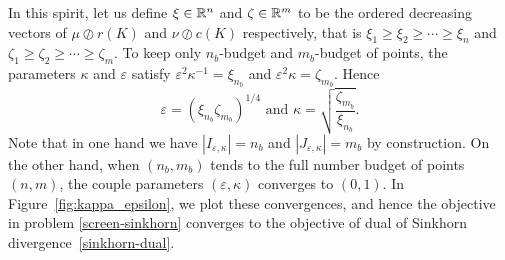 In this spirit, let us define $\xi \in {\mathbb{R}}^n$ and $\zeta \in {\mathbb{R}}^m$ to be the ordered decreasing vectors of $\mu \oslash r(K)$ and $\nu \oslash c(K)$ respectively, that is $\xi_1 \geq \xi_2 \geq \cdots \geq \xi_n$ and $\zeta_1 \geq \zeta_2 \geq \cdots \geq \zeta_m$.
To keep only $n_b$-budget and $m_b$-budget of points, the parameters $\kappa$ and $\varepsilon$ satisfy ${\varepsilon^2}\kappa^{-1} = \xi_{n_b}$ and $\varepsilon^2\kappa = \zeta_{m_b}$. Hence 
\begin{equation}
\label{epsilon_kappa}
 \varepsilon = (\xi_{n_b}\zeta_{m_b})^{1/4} \text{ and } \kappa = \sqrt{\frac{\zeta_{m_b}}{\xi_{n_b}}}.
\end{equation}
Note that in one hand we have $|I_{\varepsilon, \kappa}| = n_b$ and $|J_{\varepsilon, \kappa}| = m_b$ by construction. On the other hand, when $(n_b,m_b)$ tends to the full number budget of points $(n,m)$, the couple parameters $(\varepsilon, \kappa)$ converges to $(0,1)$. 
In Figure~\ref{fig:kappa_epsilon}, we plot these convergences, and hence the objective in problem \eqref{screen-sinkhorn} converges to the objective of dual of Sinkhorn divergence~\eqref{sinkhorn-dual}.

